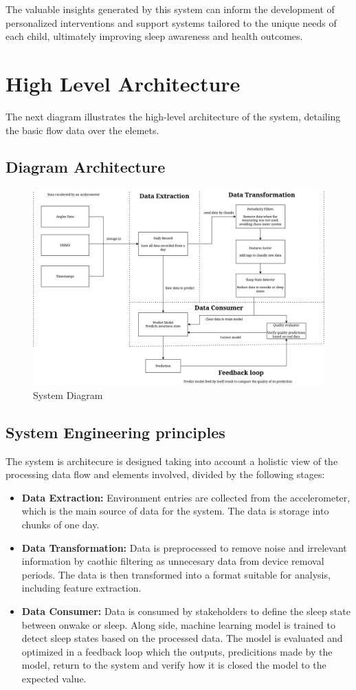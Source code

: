 \documentclass[conference]{IEEEtran}
\begin{document}
The valuable insights generated by this system can inform the development of personalized interventions and support systems tailored to the unique needs of each child, ultimately improving sleep awareness and health outcomes.

\section{High Level Architecture}
The next diagram illustrates the high-level architecture of the system, detailing the basic flow data over the elemets.
\subsection{Diagram Architecture}
\begin{figure}[H]
    \centering
    \includegraphics[width=\linewidth]{system.drawio(1).png}
    \caption{System Diagram}
\end{figure}
\subsection{System Engineering principles}
The system is architecure is designed taking into account a holistic view of the processing data flow and elements involved, divided by the following stages:
\begin{itemize}
	\item  \textbf{Data Extraction:} Environment entries are collected from the accelerometer, which is the main source of data for the system. The data is storage into chunks of one day.
	\item \textbf{Data Transformation:} Data is preprocessed to remove noise and irrelevant information by caothic filtering as unnecesary data from device removal periods. The data is then transformed into a format suitable for analysis, including feature extraction.
	\item \textbf{Data Consumer:} Data is consumed by stakeholders to define the sleep state between onwake or sleep. Along side, machine learning model is trained to detect sleep states based on the processed data. The model is evaluated and optimized in a feedback 
	loop which the outputs, predicitions made by the model, return to the system and verify how it is closed the model to the expected value.  
\end{itemize}
\end{document}
